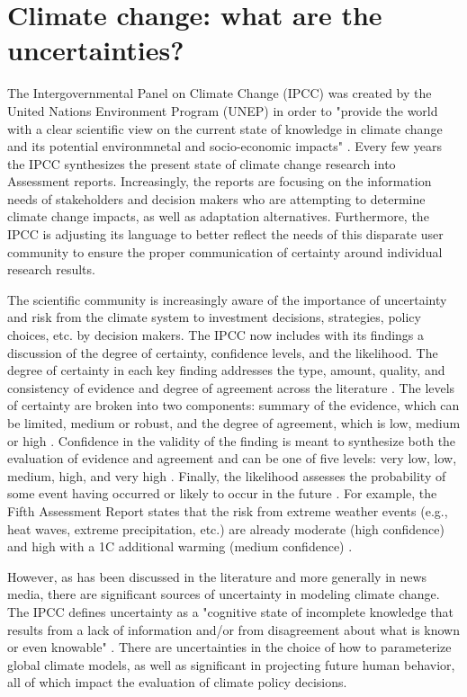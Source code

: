 \documentclass[10pt]{amsart}
\begin{document}
\section{Climate change: what are the uncertainties?}
The Intergovernmental Panel on Climate Change (IPCC) was created by the United Nations Environment Program (UNEP) in order to "provide the world with a clear scientific view on the current state of knowledge in climate change and its potential environmnetal and socio-economic impacts" \parencite[1]{ipcc2016organization}. 
Every few years the IPCC synthesizes the present state of climate change research into Assessment reports.
Increasingly, the reports are focusing on the information needs of stakeholders and decision makers who are attempting to determine climate change impacts, as well as adaptation alternatives.
Furthermore, the IPCC is adjusting its language to better reflect the needs of this disparate user community to ensure the proper communication of certainty around individual research results.

The scientific community is increasingly aware of the importance of uncertainty and risk from the climate system to investment decisions, strategies, policy choices, etc. by decision makers.
The IPCC now includes with its findings a discussion of the degree of certainty, confidence levels, and the likelihood.
The degree of certainty in each key finding addresses the type, amount, quality, and consistency of evidence and degree of agreement across the literature \parencite[6]{ipcc2016organization}.
The levels of certainty are broken into two components: summary of the evidence, which can be limited, medium or robust, and the degree of agreement, which is low, medium or high \parencite[6]{ipcc2016organization}.
Confidence in the validity of the finding is meant to synthesize both the evaluation of evidence and agreement and can be one of five levels: very low, low, medium, high, and very high \parencite[6]{ipcc2016organization}. 
Finally, the likelihood assesses the probability of some event having occurred or likely to occur in the future \parencite[6]{ipcc2016organization}.
For example, the Fifth Assessment Report states that the risk from extreme weather events (e.g., heat waves, extreme precipitation, etc.)  
are already moderate (high confidence) and high with a 1\degree C additional warming (medium confidence) \parencite[6]{ipcc2016organization}.

However, as has been discussed in the literature and more generally in news media, there are significant sources of uncertainty in modeling climate change.
The IPCC defines uncertainty as a "cognitive state of incomplete knowledge that results from a lack of information and/or from disagreement about what is known or even knowable" \parencite{kunreuther2014integrated}.
There are uncertainties in the choice of how to parameterize global climate models, as well as significant in projecting future human behavior, all of which impact the evaluation of climate policy decisions.
\end{document}
